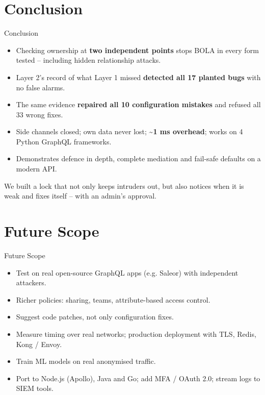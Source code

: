 \documentclass[aspectratio=169,11pt]{beamer}
\begin{document}
\section{Conclusion}
\begin{frame}{Conclusion}
\begin{itemize}
\item Checking ownership at \textbf{two independent points} stops BOLA in every form tested – including hidden relationship attacks.
\item Layer 2’s record of what Layer 1 missed \textbf{detected all 17 planted bugs} with no false alarms.
\item The same evidence \textbf{repaired all 10 configuration mistakes} and refused all 33 wrong fixes.
\item Side channels closed; own data never lost; \textbf{\textasciitilde{}1 ms overhead}; works on 4 Python GraphQL frameworks.
\item Demonstrates defence in depth, complete mediation and fail-safe defaults on a modern API.
\end{itemize}
\vfill
\begin{simplebox}We built a lock that not only keeps intruders out, but also notices when it is weak and fixes itself – with an admin’s approval.\end{simplebox}
\end{frame}

\section{Future Scope}
\begin{frame}{Future Scope}
\begin{itemize}
\item Test on real open-source GraphQL apps (e.g. Saleor) with independent attackers.
\item Richer policies: sharing, teams, attribute-based access control.
\item Suggest code patches, not only configuration fixes.
\item Measure timing over real networks; production deployment with TLS, Redis, Kong / Envoy.
\item Train ML models on real anonymised traffic.
\item Port to Node.js (Apollo), Java and Go; add MFA / OAuth 2.0; stream logs to SIEM tools.
\end{itemize}
\end{frame}
\end{document}
